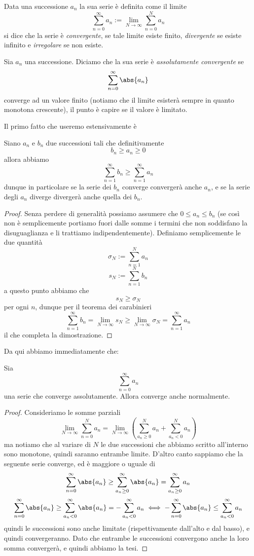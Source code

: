 \documentclass[11pt]{scrartcl}
\begin{document}
	\begin{definition}[Serie]
		Data una successione $a_n$ la sua serie è definita come il limite
		$$\sum_{n=0}^\infty a_n:=\lim_{N\to \infty}\sum_{n=0}^{N}a_n$$
		si dice che la serie è \textit{convergente}, se tale limite esiste finito, \textit{divergente} se esiste infinito e \textit{irregolare} se non esiste.
	\end{definition}
	\begin{definition}
		Sia $a_n$ una successione. Diciamo che la sua serie è \textit{assolutamente convergente} se
		$$\sum_{n=0}^{\infty}\abs{a_n}$$
		converge ad un valore finito (notiamo che il limite esisterà sempre in quanto monotona crescente), il punto è capire se il valore è limitato.
	\end{definition}
	Il primo fatto che useremo estensivamente è
	\begin{theorem}
		Siano $a_n$ e $b_n$ due successioni tali che definitivamente 
		$$b_n\ge a_n \ge 0$$
		allora abbiamo
		$$\sum_{n=1}^{\infty}b_n\ge \sum_{n=1}^{\infty}a_n$$
		dunque in particolare se la serie dei $b_n$ converge convergerà anche $a_n$, e se la serie degli $a_n$ diverge divergerà anche quella dei $b_n$. 
	\end{theorem}
	\begin{proof}
		Senza perdere di generalità possiamo assumere che $0\le a_n\le b_n$ (se così non è semplicemente portiamo fuori dalle somme i termini che non soddisfano la disuguaglianza e li trattiamo indipendentemente). Definiamo semplicemente le due quantità
		$$\sigma_N:=\sum_{n=1}^{N}a_n$$
		$$s_N:=\sum_{n=1}^{N}b_n$$
		a questo punto abbiamo che 
		$$s_N\ge \sigma_N$$
		per ogni $n$, dunque per il teorema dei carabinieri
		$$\sum_{n=1}^{\infty}b_n=\lim_{N\to\infty}s_N\ge \lim_{N\to\infty}\sigma_N=\sum_{n=1}^{\infty}a_n$$
		il che completa la dimostrazione.
	\end{proof}
	Da qui abbiamo immediatamente che:
	\begin{lemma}
		Sia 
		$$\sum_{n=0}^\infty a_n$$
		una serie che converge assolutamente. Allora converge anche normalmente.
	\end{lemma}
	\begin{proof}
		Consideriamo le somme parziali 
		$$\lim_{N\to\infty}\sum_{n=0}^{N}a_n=\lim_{N\to\infty}\left(\sum_{a_n\ge 0}^{N}a_n+\sum_{a_n<0}^{N}a_n\right)$$
		ma notiamo che al variare di $N$ le due successioni che abbiamo scritto all'interno sono monotone, quindi saranno entrambe limite. D'altro canto sappiamo che la seguente serie converge, ed è maggiore o uguale di 
		$$\sum_{n=0}^{\infty}\abs{a_n} \ge \sum_{a_n\ge 0}^{\infty}\abs{a_n}=\sum_{a_n\ge 0}^{\infty}a_n$$
		$$\sum_{n=0}^{\infty}\abs{a_n} \ge \sum_{a_n <  0}^{\infty}\abs{a_n}=-\sum_{a_n<0}^{\infty}a_n \iff -\sum_{n=0}^{\infty}\abs{a_n}\le \sum_{a_n<0}^{\infty}a_n$$
		quindi le successioni sono anche limitate (rispettivamente dall'alto e dal basso), e quindi convergeranno. Dato che entrambe le successioni convergono anche la loro somma convergerà, e quindi abbiamo la tesi.
	\end{proof}
\end{document}
